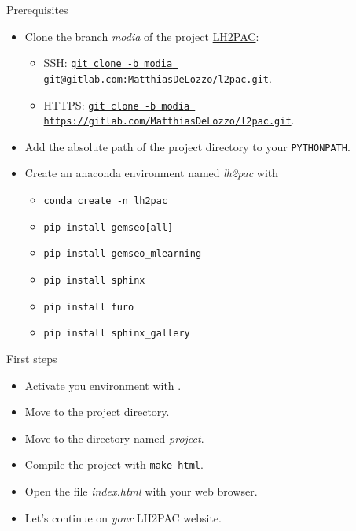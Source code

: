 \documentclass[aspectratio=169]{beamer}
\begin{document}
\begin{frame}{Prerequisites}
    \begin{itemize}
        \item Clone the branch \textit{modia} of the project \href{https://gitlab.com/MatthiasDeLozzo/l2pac/-/tree/modia}{LH2PAC}:
            \begin{itemize}
                \item SSH: \underline{\texttt{git clone -b modia git@gitlab.com:MatthiasDeLozzo/l2pac.git}}.
                \item HTTPS: \underline{\texttt{git clone -b modia https://gitlab.com/MatthiasDeLozzo/l2pac.git}}.
            \end{itemize}
        \item Add the absolute path of the project directory to your \texttt{PYTHONPATH}.
        \item Create an anaconda environment named \textit{lh2pac} with
        \begin{itemize}
            \item \texttt{conda create -n lh2pac}
            \item \texttt{pip install gemseo[all]}
            \item \texttt{pip install gemseo\_mlearning}
            \item \texttt{pip install sphinx}
            \item \texttt{pip install furo}
            \item \texttt{pip install sphinx\_gallery}
        \end{itemize}
    \end{itemize}
\end{frame}
\begin{frame}{First steps}
    \begin{itemize}
        \item Activate you environment with \underline{}.
        \item Move to the project directory.
        \item Move to the directory named \textit{project}.
        \item Compile the project with \underline{\texttt{make html}}.
        \item Open the file \textit{index.html} with your web browser.
        \item Let's continue on \textit{your} LH2PAC website.
    \end{itemize}
\end{frame}
\end{document}
